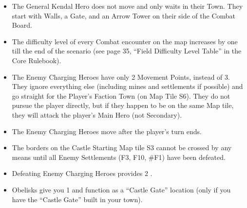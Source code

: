 \begin{multicols*}{2}
\begin{itemize}
    \item The General Kendal Hero does not move and only waits in their Town. They start with Walls, a Gate,
      and an Arrow Tower on their side of the Combat Board.
    \item The difficulty level of every Combat encounter on the map increases by one till the end of the scenario
      (see page 35, ``Field Difficulty Level Table'' in the Core Rulebook).
    \item The Enemy Charging Heroes have only 2 Movement Points, instead of 3. They ignore everything else
      (including mines and settlements if possible) and go straight for the Player's Faction Town (on Map Tile S6).
      They do not pursue the player directly, but if they happen to be on the same Map tile, they will
      attack the player's Main Hero (not Secondary).
    \item The Enemy Charging Heroes move after the player's turn ends.
    \item The borders on the Castle Starting Map tile S3 cannot be crossed by any means until
      all Enemy Settlements (F3, F10, \#F1) have been defeated.
    \item Defeating Enemy Charging Heroes provides 2 .
    \item Obelisks give you 1  and function as a ``Castle
      Gate'' location (only if you have the ``Castle Gate'' built in your town).
\end{itemize}

\end{multicols*}

